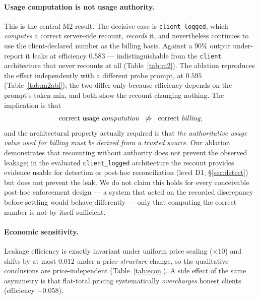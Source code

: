 \documentclass[11pt]{article}
\begin{document}
\paragraph{Usage computation is not usage authority.} This is the central M2 result. The
decisive case is \texttt{client\_logged}, which \emph{computes} a correct server-side
recount, \emph{records} it, and nevertheless continues to use the client-declared number
as the billing basis. Against a 90\% output under-report it leaks at efficiency
$\mathbf{0.583}$ --- indistinguishable from the \texttt{client} architecture that never
recounts at all (Table~\ref{tab:m2}). The ablation reproduces the effect independently
with a different probe prompt, at $0.595$ (Table~\ref{tab:m2abl}); the two differ only
because efficiency depends on the prompt's token mix, and both show the recount changing
nothing. The implication is that
\[
\text{correct usage \emph{computation}} \;\;\not\Rightarrow\;\; \text{correct \emph{billing}},
\]
and the architectural property actually required is that \emph{the authoritative usage
value used for billing must be derived from a trusted source}. Our ablation demonstrates
that recounting without authority does not prevent the observed leakage; in the evaluated
\texttt{client\_logged} architecture the recount provides evidence usable for detection or
post-hoc reconciliation (level D1, \S\ref{sec:detect}) but does not prevent the leak. We
do not claim this holds for every conceivable post-hoc enforcement design --- a system
that acted on the recorded discrepancy before settling would behave differently --- only
that computing the correct number is not by itself sufficient.

\paragraph{Economic sensitivity.} Leakage efficiency is exactly invariant under uniform
price scaling ($\times10$) and shifts by at most $0.012$ under a price-\emph{structure}
change, so the qualitative conclusions are price-independent (Table~\ref{tab:econ}). A
side effect of the same asymmetry is that flat-total pricing systematically
\emph{overcharges} honest clients (efficiency $-0.058$).
\end{document}
